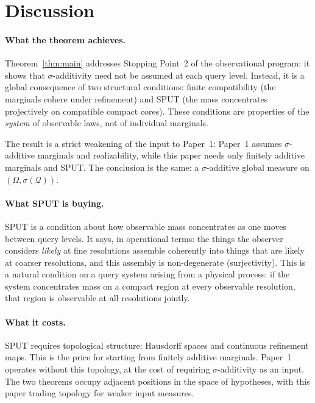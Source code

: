 \documentclass[11pt]{article}
\theoremstyle{definition}
\newcommand{\Qcal}{\mathcal{Q}}
\begin{document}
\section{Discussion}\label{sec:discussion}

\paragraph{What the theorem achieves.}
Theorem~\ref{thm:main} addresses Stopping Point~2 of the
observational program: it shows that $\sigma$-additivity need not
be assumed at each query level.  Instead, it is a global consequence
of two structural conditions: finite compatibility (the marginals
cohere under refinement) and SPUT (the mass concentrates
projectively on compatible compact cores).  These conditions are
properties of the \emph{system} of observable laws, not of
individual marginals.

The result is a strict weakening of the input to Paper~1:
Paper~1 assumes $\sigma$-additive marginals and realizability,
while this paper needs only finitely additive marginals and SPUT.
The conclusion is the same: a $\sigma$-additive global measure on
$(\Omega, \sigma(\Qcal))$.

\paragraph{What SPUT is buying.}
SPUT is a condition about how observable mass concentrates as one
moves between query levels.  It says, in operational terms: the
things the observer considers \emph{likely} at fine resolutions
assemble coherently into things that are likely at coarser
resolutions, and this assembly is non-degenerate (surjectivity).
This is a natural condition on a query system arising from a
physical process: if the system concentrates mass on a compact
region at every observable resolution, that region is observable
at all resolutions jointly.

\paragraph{What it costs.}
SPUT requires topological structure: Hausdorff spaces and continuous
refinement maps.  This is the price for starting from finitely
additive marginals.  Paper~1 operates without this topology, at
the cost of requiring $\sigma$-additivity as an input.  The two
theorems occupy adjacent positions in the space of hypotheses,
with this paper trading topology for weaker input measures.
\end{document}
